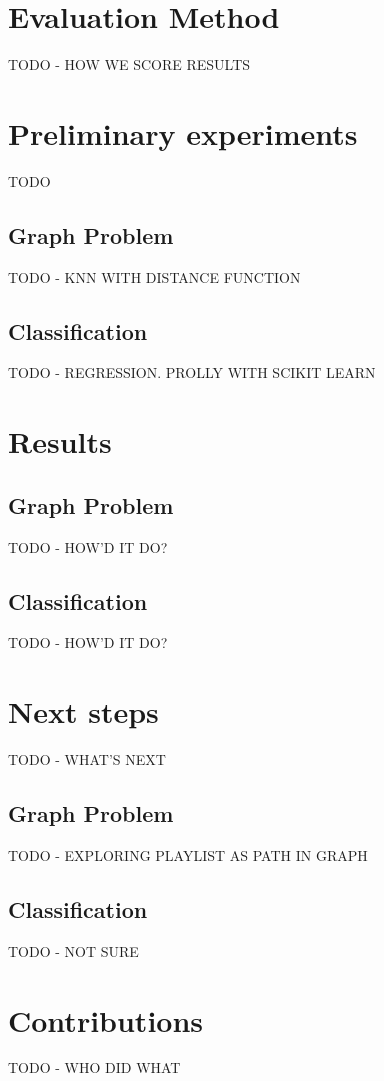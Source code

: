 \documentclass[10pt,journal,compsoc]{IEEEtran}
\begin{document}
\section{Evaluation Method}
TODO - HOW WE SCORE RESULTS

\section{Preliminary experiments}
TODO

\subsection{Graph Problem}
TODO - KNN WITH DISTANCE FUNCTION

\subsection{Classification}
TODO - REGRESSION. PROLLY WITH SCIKIT LEARN

\section{Results}

\subsection{Graph Problem}
TODO - HOW'D IT DO?

\subsection{Classification}
TODO - HOW'D IT DO?

\section{Next steps}
TODO - WHAT'S NEXT

\subsection{Graph Problem}
TODO - EXPLORING PLAYLIST AS PATH IN GRAPH

\subsection{Classification}
TODO - NOT SURE

\section{Contributions}
TODO - WHO DID WHAT
\end{document}
